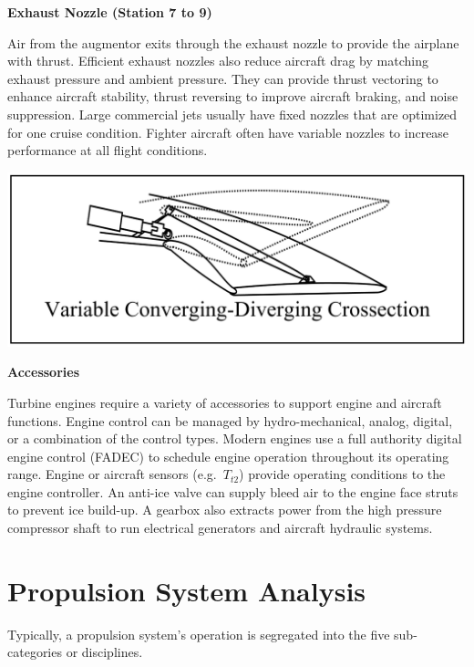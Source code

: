 \documentclass[
]{book}
\begin{document}
\textbf{Exhaust Nozzle (Station 7 to 9)}

Air from the augmentor exits through the exhaust nozzle to provide the airplane
with thrust. Efficient exhaust nozzles also reduce aircraft drag by matching
exhaust pressure and ambient pressure. They can provide thrust vectoring to
enhance aircraft stability, thrust reversing to improve aircraft braking, and
noise suppression. Large commercial jets usually have fixed nozzles that are
optimized for one cruise condition. Fighter aircraft often have variable nozzles
to increase performance at all flight conditions.

\includegraphics{media/17/variable-nozzle.png}

\textbf{Accessories}

Turbine engines require a variety of accessories to support engine and aircraft
functions. Engine control can be managed by hydro-mechanical, analog, digital,
or a combination of the control types. Modern engines use a full authority
digital engine control (FADEC) to schedule engine operation throughout its
operating range. Engine or aircraft sensors (e.g.~\(T_{t2}\)) provide operating
conditions to the engine controller. An anti-ice valve can supply bleed air to
the engine face struts to prevent ice build-up. A gearbox also extracts power
from the high pressure compressor shaft to run electrical generators and
aircraft hydraulic systems.

\hypertarget{propulsion-system-analysis}{%
\section{Propulsion System Analysis}\label{propulsion-system-analysis}}

Typically, a propulsion system's operation is segregated into the five
sub-categories or disciplines.
\end{document}
